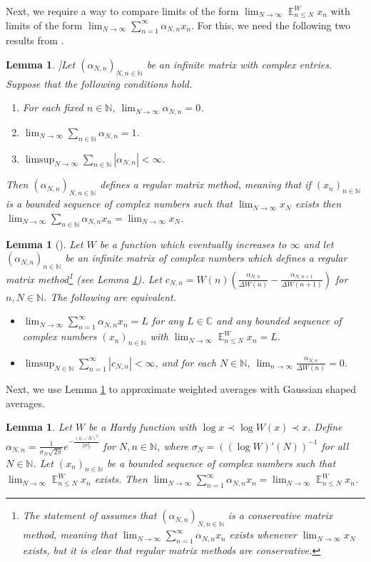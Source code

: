 \documentclass[12pt]{article}
\theoremstyle{plain} %
\newtheorem{lemma}[theorem]{Lemma}
\theoremstyle{definition} %
\theoremstyle{plain}
\theoremstyle{plain}
\numberwithin{equation}{section}
\newcommand{\N}{\mathbb{N}}
\newcommand{\C}{\mathbb{C}}
\renewcommand{\leq}{\leqslant}
\newcommand{\1}{\mathbbm{1}}
\newcommand{\E}{\operatorname{\mathbb{E}}}
\newcommand{\oo}{\infty}
\begin{document}
Next, we require a way to compare limits of the form  $\lim_{N\to\oo}\E^W_{n\leq N}x_n$ with limits of the form $\lim_{N\to\oo}\sum_{n=1}^{\oo}\alpha_{N,n}x_n$. For this, we need the following two results from \cite{Boos}.
\begin{lemma}{\cite[Theorem 2.3.7]{Boos}}]\label{lem:silverman_toeplitz}
Let $(\alpha_{N,n})_{N,n\in \N}$ be an infinite matrix with complex entries. Suppose that the following conditions hold.
\begin{enumerate}
    \item For each fixed $n\in \N$, $\lim_{N\to\oo}\alpha_{N,n} = 0$.   
    \item $\lim_{N\to\oo}\sum_{n\in \N}\alpha_{N,n}=1$.
    \item $\limsup_{N\to\oo}\sum_{n\in \N}|\alpha_{N,n}|<\oo$.
\end{enumerate}
Then $(\alpha_{N,n})_{N,n\in \N}$ defines a {regular matrix method}, meaning that if $(x_n)_{n\in \N}$ is a bounded sequence  of complex numbers such that $\lim_{N\to\oo}x_N$ exists then $\lim_{N\to\oo}\sum_{n\in \N}\alpha_{N,n}x_n=\lim_{N\to\oo}x_N$.
\end{lemma}
\begin{lemma}[{\cite[Theorem 3.2.8]{Boos}}]\label{lem:Boos}
    Let $W$ be a function which eventually increases to $\oo$ and let $(\alpha_{N,n})_{n\in \N}$ be an infinite matrix of complex numbers which defines a regular matrix method\footnote{The statement of \cite[Theorem 3.2.8]{Boos} assumes that $(\alpha_{N,n})_{N,n\in \N}$ is a \emph{conservative matrix method}, meaning that $\lim_{N\to\oo}\sum_{n=1}^{\oo}\alpha_{N,n}x_n$ exists whenever $\lim_{N\to\oo}x_N$ exists, but it is clear that regular matrix methods are conservative.} (see Lemma \ref{lem:silverman_toeplitz}). Let $c_{N,n} = W(n)\left(\frac{\alpha_{N,n}}{\Delta W(n)}-\frac{\alpha_{N,n+1}}{\Delta W(n+1)}\right)$ for $n,N\in \N$. The following are equivalent.
    \begin{itemize}
        \item $\lim_{N\to\oo}\sum_{n=1}^{\oo}\alpha_{N,n}x_n = L$ for any $L\in \C$ and any bounded sequence of complex numbers $(x_n)_{n\in \N}$ with $\lim_{N\to\oo}\E_{n\leq N}^Wx_n = L$.
        \item  $\limsup_{N\in \N} \sum_{n=1}^{\oo}|c_{N,n}|<\oo$, and for each $N\in \N$, $\lim_{n\to\oo}\frac{\alpha_{N,n}}{\Delta W(n)} = 0$.
    \end{itemize}
\end{lemma}

Next, we use Lemma \ref{lem:Boos} to approximate weighted averages with Gaussian shaped averages.
\begin{lemma}
\label{lem:gauss_stronger_than_weighted}
 Let $W$ be a Hardy function with $\log x\prec \log W(x)\prec x$. Define $\alpha_{N,n} = \frac{1}{\sigma_N\sqrt{2\pi}}e^{-\frac{(n-N)^2}{2\sigma_N^2}}$ for $N,n\in \N$, where $\sigma_N = ((\log W)'(N))^{-1}$ for all $N\in \N$. Let $(x_n)_{n\in \N}$ be a bounded sequence of complex numbers such that $\lim_{N\to\oo}\E_{n\leq N}^Wx_n$ exists. Then  $\lim_{N\to\oo}\sum_{n=1}^{\oo}\alpha_{N,n}x_n = \lim_{N\to\oo}\E_{n\leq N}^Wx_n$.
\end{lemma}
\end{document}
